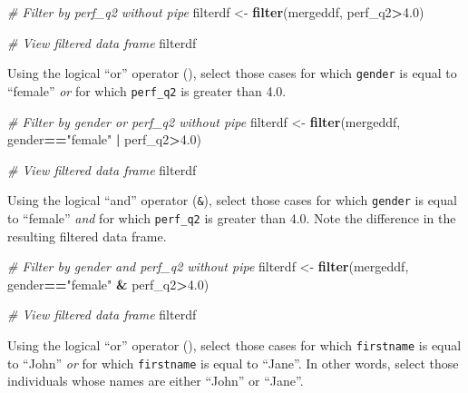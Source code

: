 \documentclass[]{book}
\newenvironment{Shaded}{\begin{snugshade}}{\end{snugshade}}
\newcommand{\KeywordTok}[1]{\textcolor[rgb]{0.13,0.29,0.53}{\textbf{#1}}}
\newcommand{\FloatTok}[1]{\textcolor[rgb]{0.00,0.00,0.81}{#1}}
\newcommand{\StringTok}[1]{\textcolor[rgb]{0.31,0.60,0.02}{#1}}
\newcommand{\CommentTok}[1]{\textcolor[rgb]{0.56,0.35,0.01}{\textit{#1}}}
\newcommand{\OperatorTok}[1]{\textcolor[rgb]{0.81,0.36,0.00}{\textbf{#1}}}
\newcommand{\NormalTok}[1]{#1}
\begin{document}
\begin{Shaded}
\begin{Highlighting}[]
\CommentTok{# Filter by perf_q2 without pipe}
\NormalTok{filterdf <-}\StringTok{ }\KeywordTok{filter}\NormalTok{(mergeddf, perf_q2}\OperatorTok{>}\FloatTok{4.0}\NormalTok{)}

\CommentTok{# View filtered data frame}
\NormalTok{filterdf}
\end{Highlighting}
\end{Shaded}

Using the logical ``or'' operator (\texttt{\textbar{}}), select those
cases for which \texttt{gender} is equal to ``female'' \emph{or} for
which \texttt{perf\_q2} is greater than 4.0.

\begin{Shaded}
\begin{Highlighting}[]
\CommentTok{# Filter by gender or perf_q2 without pipe}
\NormalTok{filterdf <-}\StringTok{ }\KeywordTok{filter}\NormalTok{(mergeddf, gender}\OperatorTok{==}\StringTok{"female"} \OperatorTok{|}\StringTok{ }\NormalTok{perf_q2}\OperatorTok{>}\FloatTok{4.0}\NormalTok{)}

\CommentTok{# View filtered data frame}
\NormalTok{filterdf}
\end{Highlighting}
\end{Shaded}

Using the logical ``and'' operator (\texttt{\&}), select those cases for
which \texttt{gender} is equal to ``female'' \emph{and} for which
\texttt{perf\_q2} is greater than 4.0. Note the difference in the
resulting filtered data frame.

\begin{Shaded}
\begin{Highlighting}[]
\CommentTok{# Filter by gender and perf_q2 without pipe}
\NormalTok{filterdf <-}\StringTok{ }\KeywordTok{filter}\NormalTok{(mergeddf, gender}\OperatorTok{==}\StringTok{"female"} \OperatorTok{&}\StringTok{ }\NormalTok{perf_q2}\OperatorTok{>}\FloatTok{4.0}\NormalTok{)}

\CommentTok{# View filtered data frame}
\NormalTok{filterdf}
\end{Highlighting}
\end{Shaded}

Using the logical ``or'' operator (\texttt{\textbar{}}), select those
cases for which \texttt{firstname} is equal to ``John'' \emph{or} for
which \texttt{firstname} is equal to ``Jane''. In other words, select
those individuals whose names are either ``John'' or ``Jane''.
\end{document}
